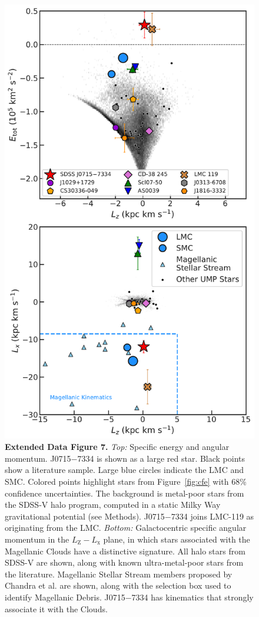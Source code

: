 \documentclass{natureprintstyle}
\newcommand{\umpstar}{J0715$-$7334\xspace}
\begin{document}
\begin{figure}%
    \centering
    \includegraphics[width=\linewidth]{nature_ELall.pdf}
    \caption{\textbf{Extended Data Figure 7.} 
    \textit{Top:} Specific energy and angular momentum. \umpstar is shown as a large red star. Black points show a literature sample. Large blue circles indicate the LMC and SMC. Colored points highlight stars from Figure~\ref{fig:cfe} with 68\% confidence uncertainties. The background is metal-poor stars from the SDSS-V halo program, computed in a static Milky Way gravitational potential (see Methods). \umpstar joins LMC-119\cite{Chiti2024} as originating from the LMC.
    \textit{Bottom:}
    Galactocentric specific angular momentum in the $L_\mathrm{Z}-L_\mathrm{x}$ plane, in which stars associated with the Magellanic Clouds have a distinctive signature\cite{Chandra2023b}. 
    All halo stars from SDSS-V are shown, along with known ultra-metal-poor stars from the literature.
    Magellanic Stellar Stream members proposed by Chandra et al.\cite{Chandra2023b} are shown, along with the selection box used to identify Magellanic Debris. 
    \umpstar has kinematics that strongly associate it with the Clouds.}
    \label{fig:lxlz}
\end{figure}
\end{document}
